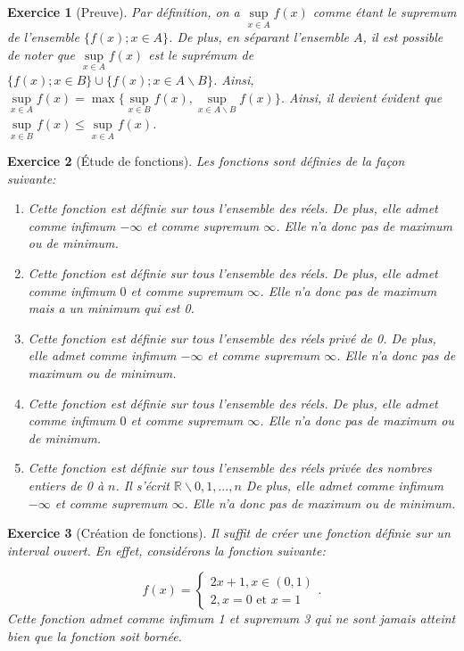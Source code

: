 \documentclass{article}
\newcommand{\Rr}{{\mathbb{R}}}
\theoremstyle{exercice}
\newtheorem{exercice}{Exercice}
\begin{document}
\begin{exercice}[Preuve]
    Par définition, on a  $\underset{x\in A}{\sup}f(x)$ comme étant le supremum de l'ensemble $\{f(x) ; x\in A\}$. De plus, en séparant l'ensemble $A$, il est possible de noter que $\underset{x\in A}{\sup}f(x)$ est le suprémum de $\{f(x) ; x\in B\} \cup \{f(x) ; x\in A\backslash B\}$. Ainsi, $\underset{x\in A}{\sup}f(x) = \max \{\underset{x\in B}{\sup}f(x), \underset{x\in A \backslash B}{\sup}f(x) \}$. Ainsi, il devient évident que $\underset{x\in B}{\sup}f(x) \leq \underset{x\in A}{\sup}f(x)$.

\end{exercice}

\begin{exercice}[Étude de fonctions]
Les fonctions sont définies de la façon suivante:
    \begin{enumerate}
    \item Cette fonction est définie sur tous l'ensemble des réels. De plus, elle admet comme infimum $-\infty$ et comme supremum $\infty$. Elle n'a donc pas de maximum ou de minimum.
    \item Cette fonction est définie sur tous l'ensemble des réels. De plus, elle admet comme infimum $0$ et comme supremum $\infty$. Elle n'a donc pas de maximum mais a un minimum qui est 0.
    \item Cette fonction est définie sur tous l'ensemble des réels privé de 0. De plus, elle admet comme infimum $-\infty$ et comme supremum $\infty$. Elle n'a donc pas de maximum ou de minimum.
    \item Cette fonction est définie sur tous l'ensemble des réels. De plus, elle admet comme infimum $0$ et comme supremum $\infty$. Elle n'a donc pas de maximum ou de minimum.
    \item Cette fonction est définie sur tous l'ensemble des réels privée des nombres entiers de 0 à $n$. Il s'écrit $\Rr \backslash {0, 1,...,n}$ De plus, elle admet comme infimum $-\infty$ et comme supremum $\infty$. Elle n'a donc pas de maximum ou de minimum.
\end{enumerate}
\end{exercice}


\begin{exercice}[Création de fonctions]
    Il suffit de créer une fonction définie sur un interval ouvert. En effet, considérons la fonction suivante:

\begin{equation}
    f(x)=\begin{cases}
        2x+1, x\in (0,1)\\
        2, x=0 \text{ et } x=1
    \end{cases}.
\end{equation}
Cette fonction admet comme infimum 1 et supremum 3 qui ne sont jamais atteint bien que la fonction soit bornée.

\end{exercice}
\end{document}
